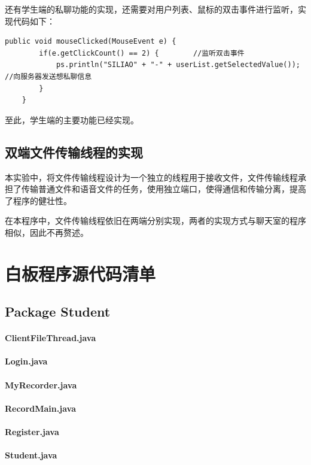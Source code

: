 \documentclass[UTF8,12pt]{article}
\begin{document}
还有学生端的私聊功能的实现，还需要对用户列表、鼠标的双击事件进行监听，实现代码如下：

\begin{lstlisting}[title=鼠标双击事件的监听,frame=shadowbox]
    public void mouseClicked(MouseEvent e) {
        if(e.getClickCount() == 2) {        //监听双击事件
            ps.println("SILIAO" + "-" + userList.getSelectedValue());       //向服务器发送想私聊信息
        }
    }
\end{lstlisting}

至此，学生端的主要功能已经实现。

\subsection{双端文件传输线程的实现}
本实验中，将文件传输线程设计为一个独立的线程用于接收文件，文件传输线程承担了传输普通文件和语音文件的任务，使用独立端口，使得通信和传输分离，提高了程序的健壮性。

在本程序中，文件传输线程依旧在两端分别实现，两者的实现方式与聊天室的程序相似，因此不再赘述。

\newpage

\section{白板程序源代码清单}
\subsection{Package Student}
\paragraph{ClientFileThread.java}
\paragraph{Login.java}
\paragraph{MyRecorder.java}
\paragraph{RecordMain.java}
\paragraph{Register.java}
\paragraph{Student.java}
\end{document}
